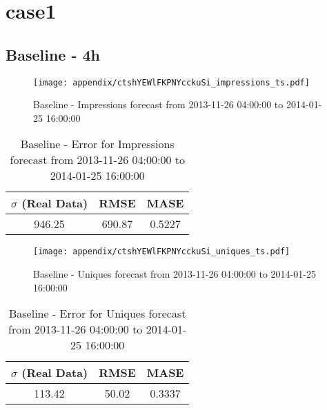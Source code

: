 \chapter{case1}

\section{Baseline - 4h}
\begin{figure}[H] \begin{center} \leavevmode
\texttt{[image: appendix/ctshYEWlFKPNYcckuSi\_impressions\_ts.pdf]} \caption{
Baseline - Impressions forecast from 2013-11-26 04:00:00 to 2014-01-25 16:00:00} \label{fig:appendix/ctshYEWlFKPNYcckuSi_impressions_ts.pdf} \end{center}
\end{figure}

\begin{table}[H]
\centering
\footnotesize
\begin{tabular}{ccc}
$\sigma$ (Real Data) & RMSE & MASE   \\ \hline
946.25 & 690.87 & 0.5227 \\
\end{tabular}

\vspace{0.5cm}

\caption{
Baseline - Error for Impressions forecast from 2013-11-26 04:00:00 to 2014-01-25 16:00:00}
\end{table}

\begin{figure}[H] \begin{center} \leavevmode
\texttt{[image: appendix/ctshYEWlFKPNYcckuSi\_uniques\_ts.pdf]} \caption{
Baseline - Uniques forecast from 2013-11-26 04:00:00 to 2014-01-25 16:00:00} \label{fig:appendix/ctshYEWlFKPNYcckuSi_uniques_ts.pdf} \end{center}
\end{figure}

\begin{table}[H]
\centering
\footnotesize
\begin{tabular}{ccc}
$\sigma$ (Real Data) & RMSE & MASE   \\ \hline
113.42 & 50.02 & 0.3337 \\
\end{tabular}

\vspace{0.5cm}

\caption{
Baseline - Error for Uniques forecast from 2013-11-26 04:00:00 to 2014-01-25 16:00:00}
\end{table}

